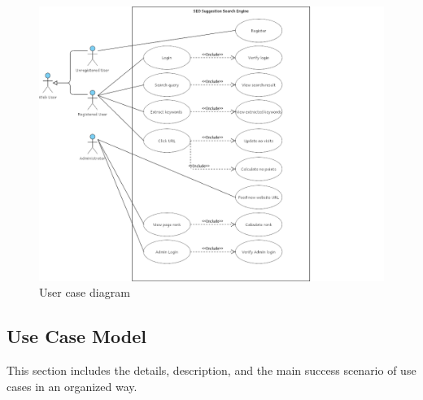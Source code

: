 \documentclass{scrartcl}
\begin{document}
\begin{figure}[H]
  \begin{center}
    \caption{User case diagram}
    \includegraphics[scale=0.44]{use-cases-diagram.png}
  \end{center}
\end{figure}

\newpage

\subsection{Use Case Model}

This section includes the details, description, and the main success scenario of use cases in an organized way.
\end{document}
